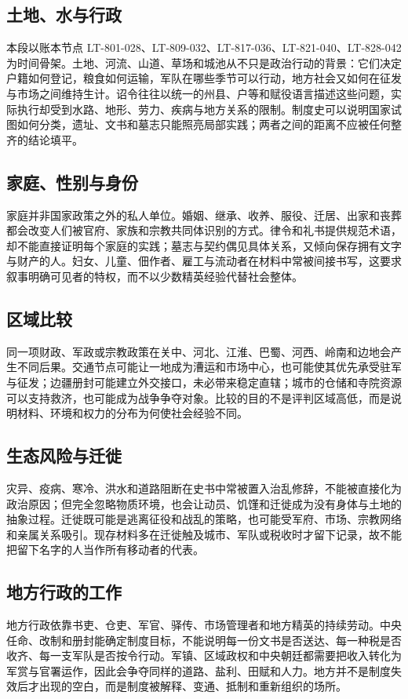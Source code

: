 \subsection{土地、水与行政}
本段以账本节点 LT-801-028、LT-809-032、LT-817-036、LT-821-040、LT-828-042 为时间骨架。土地、河流、山道、草场和城池从不只是政治行动的背景：它们决定户籍如何登记，粮食如何运输，军队在哪些季节可以行动，地方社会又如何在征发与市场之间维持生计。诏令往往以统一的州县、户等和赋役语言描述这些问题，实际执行却受到水路、地形、劳力、疾病与地方关系的限制。制度史可以说明国家试图如何分类，遗址、文书和墓志只能照亮局部实践；两者之间的距离不应被任何整齐的结论填平。

\subsection{家庭、性别与身份}
家庭并非国家政策之外的私人单位。婚姻、继承、收养、服役、迁居、出家和丧葬都会改变人们被官府、家族和宗教共同体识别的方式。律令和礼书提供规范术语，却不能直接证明每个家庭的实践；墓志与契约偶见具体关系，又倾向保存拥有文字与财产的人。妇女、儿童、佃作者、雇工与流动者在材料中常被间接书写，这要求叙事明确可见者的特权，而不以少数精英经验代替社会整体。

\subsection{区域比较}
同一项财政、军政或宗教政策在关中、河北、江淮、巴蜀、河西、岭南和边地会产生不同后果。交通节点可能让一地成为漕运和市场中心，也可能使其优先承受驻军与征发；边疆册封可能建立外交接口，未必带来稳定直辖；城市的仓储和寺院资源可以支持救济，也可能成为战争争夺对象。比较的目的不是评判区域高低，而是说明材料、环境和权力的分布为何使社会经验不同。

\subsection{生态风险与迁徙}
灾异、疫病、寒冷、洪水和道路阻断在史书中常被置入治乱修辞，不能被直接化为政治原因；但完全忽略物质环境，也会让动员、饥馑和迁徙成为没有身体与土地的抽象过程。迁徙既可能是逃离征役和战乱的策略，也可能受军府、市场、宗教网络和亲属关系吸引。现存材料多在迁徙触及城市、军队或税收时才留下记录，故不能把留下名字的人当作所有移动者的代表。

\subsection{地方行政的工作}
地方行政依靠书吏、仓吏、军官、驿传、市场管理者和地方精英的持续劳动。中央任命、改制和册封能确定制度目标，不能说明每一份文书是否送达、每一种税是否收齐、每一支军队是否按令行动。军镇、区域政权和中央朝廷都需要把收入转化为军赏与官署运作，因此会争夺同样的道路、盐利、田赋和人力。地方并不是制度失效后才出现的空白，而是制度被解释、变通、抵制和重新组织的场所。

